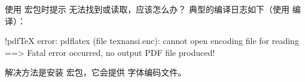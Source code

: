 \begin{myQA}{使用  宏包时提示  无法找到或读取，应该怎么办？}
	典型的编译日志如下（使用  编译）：
\begin{myCode}
!pdfTeX error: pdflatex (file texnansi.enc): cannot open encoding file for reading
==> Fatal error occurred, no output PDF file produced!
\end{myCode}
	解决方法是安装   宏包，它会提供  字体编码文件。
\end{myQA}